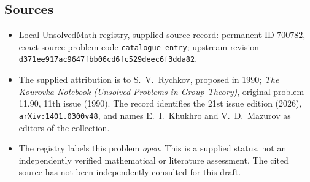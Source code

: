\documentclass[11pt]{article}
\begin{document}
\subsection{Sources}
\begin{itemize}
\item Local UnsolvedMath registry, supplied source record: permanent ID \(700782\), exact source problem code \texttt{catalogue entry}; upstream revision \texttt{d371ee917ac9647fbb06cd6fc529deec6f3dda82}.
\item The supplied attribution is to S.\ V.\ Rychkov, proposed in 1990; \emph{The Kourovka Notebook (Unsolved Problems in Group Theory)}, original problem 11.90, 11th issue (1990). The record identifies the 21st issue edition (2026), \texttt{arXiv:1401.0300v48}, and names E.\ I.\ Khukhro and V.\ D.\ Mazurov as editors of the collection.
\item The registry labels this problem \emph{open}. This is a supplied status, not an independently verified mathematical or literature assessment. The cited source has not been independently consulted for this draft.
\end{itemize}
\end{document}
